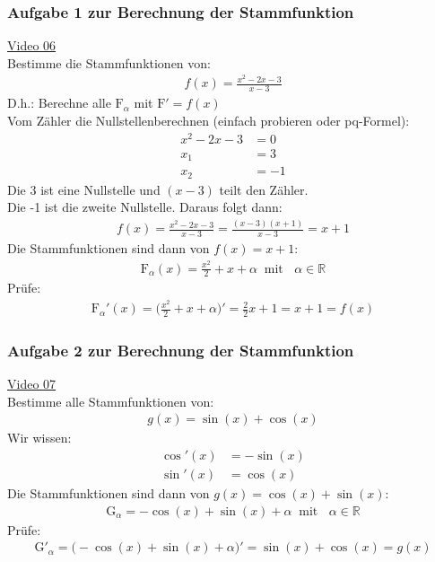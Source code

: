 \subsubsection{ Aufgabe 1 zur Berechnung der Stammfunktion}
\href{https://youtu.be/bMi4SyWZKcg}{Video 06}\\
Bestimme die Stammfunktionen von:\\
\begin{align*}
f(x)=\frac{x^2-2x-3}{x-3}
\end{align*}
D.h.: Berechne alle $\mathrm{F}_\alpha$ mit $ \mathrm{F}'=f(x) $\\
Vom Zähler die Nullstellenberechnen (einfach probieren oder pq-Formel):\\
\begin{align*}
x^2-2x-3&=0\\
x_1&=3\\
x_2&=-1
\end{align*}
Die 3 ist eine Nullstelle und $ (x-3) $ teilt den Zähler.\\
Die -1 ist die zweite Nullstelle. Daraus folgt dann:\\
\begin{align*}
f(x)=\frac{x^2-2x-3}{x-3}=\frac{(x-3)(x+1)}{x-3}=x+1
\end{align*}
Die Stammfunktionen sind dann von $ f(x)=x+1 $:\\
\begin{align*}
\mathrm{F}_\alpha(x)=\frac{x^2}{2}+x+\alpha\;\;\text{mit }\;\; \alpha\in\mathbb{R}
\end{align*}
Prüfe:\
\begin{align*}
\mathrm{F}_\alpha'(x)=\bigg(\frac{x^2}{2}+x+\alpha\bigg)'=\frac{2}{2}x+1=x+1=f(x)
\end{align*}
\subsubsection{ Aufgabe 2 zur Berechnung der Stammfunktion}
\href{https://youtu.be/hunCkb-iq2Q}{Video 07}\\
Bestimme alle Stammfunktionen von:\\
\begin{align*}
g(x) =\sin(x)+\cos(x)
\end{align*}
Wir wissen:\\
\begin{align*}
\cos'(x)&=-\sin(x)\\
\sin'(x)&=\cos(x)
\end{align*}
Die Stammfunktionen sind dann von $ g(x)=\cos(x)+\sin(x) $:\\
\begin{align*}
\mathrm{G}_\alpha=-\cos(x)+\sin(x)+\alpha\;\;\text{mit }\;\; \alpha\in\mathbb{R}
\end{align*}
Prüfe:\\
\begin{align*}
\mathrm{G}'_\alpha=\bigg(-\cos(x)+\sin(x)+\alpha\bigg)'=\sin(x)+\cos(x)=g(x)
\end{align*}
